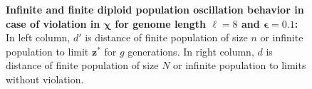 \begin{figure}[h]
\begin{center}
\hspace{-3em}%
\vspace{-0.5em}  \hspace{-3em}%


\caption{\textbf{Infinite and finite diploid population oscillation behavior in case of violation in $\bm{\chi}$ for genome length $\ell = 8$ and $\bm{\epsilon} = 0.1$:} 
  In left column, $d'$ is distance of finite population of size $n$ or infinite population to limit $\bm{z}^\ast$ for $g$ generations. In right column, $d$ is distance of finite population of size $N$ or infinite population to limits without violation.}
\label{oscillation_8d_vio_chi_0.1}
\end{center}
\end{figure}

